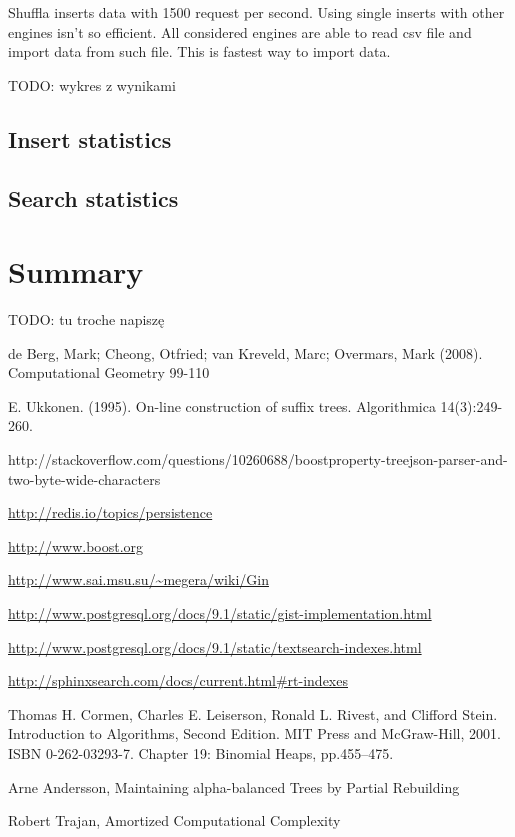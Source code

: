 \documentclass[10pt,a4paper]{article}
\newcommand{\todo}[1]{\noindent\colorbox{myRed}{TODO: #1}}
\begin{document}
Shuffla inserts data with 1500 request per second. Using single inserts with other engines isn't so efficient. All considered engines are able to read csv file and import data from such file. This is fastest way to import data.

\todo{wykres z wynikami}

\subsection{Insert statistics}

\subsection{Search statistics}


\section{Summary}

\todo{tu troche napiszę}


\begin{thebibliography}{99}

 de Berg, Mark; Cheong, Otfried; van Kreveld, Marc; Overmars, Mark (2008). Computational Geometry 99-110

 E. Ukkonen. (1995). On-line construction of suffix trees. Algorithmica 14(3):249-260.

 http://stackoverflow.com/questions/10260688/boostproperty-treejson-parser-and-two-byte-wide-characters

 \url{http://redis.io/topics/persistence}

 \url{http://www.boost.org}

 \url{http://www.sai.msu.su/~megera/wiki/Gin}

 \url{http://www.postgresql.org/docs/9.1/static/gist-implementation.html}

 \url{http://www.postgresql.org/docs/9.1/static/textsearch-indexes.html}

 \url{http://sphinxsearch.com/docs/current.html#rt-indexes}

Thomas H. Cormen, Charles E. Leiserson, Ronald L. Rivest, and Clifford Stein. Introduction to Algorithms, Second Edition. MIT Press and McGraw-Hill, 2001. ISBN 0-262-03293-7. Chapter 19: Binomial Heaps, pp.455–475.

 Arne Andersson, Maintaining alpha-balanced Trees by Partial Rebuilding

 Robert Trajan, Amortized Computational Complexity

\end{thebibliography}
\end{document}
